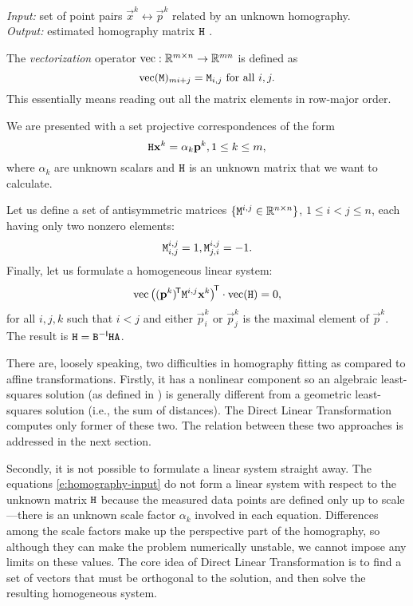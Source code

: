 \textit{Input:} set of point pairs $\vec x^k \leftrightarrow \vec p^k$ related by an unknown homography.\\
\textit{Output:} estimated homography matrix $\mathtt{H}$ .\\

\begin{definition}
The \textit{vectorization} operator $\mathrm{vec} : \mathbb{R}^{m \times n} \to \mathbb{R}^{mn}$ is defined as
$$\mathrm{vec}(\mathtt{M})_{m i + j} = \mathtt{M}_{i,j} \textrm{ for all } i, j.$$
This essentially means reading out all the matrix elements in row-major order.
\end{definition}

We are presented with a set projective correspondences of the form
\begin{equation} \label{e:homography-input}
\mathtt{H} \mathbf{x}^k = \alpha_k \mathbf{p}^k, 1 \leq k \leq m,
\end{equation}
where $\alpha_k$ are unknown scalars and $\mathtt{H}$ is an unknown matrix that we want to calculate.

Let us define a set of antisymmetric matrices $\{\mathtt{M}^{i, j} \in \mathbb{R}^{n \times n}\}$, $1 \leq i < j \leq n$, each having only two nonzero elements:
\begin{equation} \label{e:homography-antisymm}
\mathtt{M}^{i, j}_{i, j} = 1,
\mathtt{M}^{i, j}_{j, i} = -1.
\end{equation}
Finally, let us formulate a homogeneous linear system:
\begin{equation} \label{e:homography-system}
\mathrm{vec} \left(({\mathbf{p}}^k)^{\!\mathsf{T}} \mathtt{M}^{i, j} {\mathbf{x}}^k \right)^{\!\mathsf{T}} \cdot \mathrm{vec}(\mathtt{H}) = 0,
\end{equation}
for all $i, j, k$ such that $i < j$ and either $\vec p^k_i$ or $\vec p^k_j$ is the maximal element of $\vec p^k$.
The result is $\mathtt{H} = \mathtt{B} ^{-\mathsf{I}} \mathtt{H} \mathtt{A}$.

There are, loosely speaking, two difficulties in homography fitting as compared to affine transformations.
Firstly, it has a nonlinear component so an algebraic least-squares solution (as defined in \cite[p.93]{hartley03}) is generally different from a geometric least-squares solution (i.e., the sum of distances).
The Direct Linear Transformation computes only former of these two.
The relation between these two approaches is addressed in the next section.

Secondly, it is not possible to formulate a linear system straight away.
The equations \eqref{e:homography-input} do not form a linear system with respect to the unknown matrix $\mathtt{H}$ because the measured data points are defined only up to scale---there is an unknown scale factor $\alpha_k$ involved in each equation.
Differences among the scale factors make up the perspective part of the homography, so although they can make the problem numerically unstable, we cannot impose any limits on these values.
The core idea of Direct Linear Transformation is to find a set of vectors that must be orthogonal to the solution, and then solve the resulting homogeneous system.

